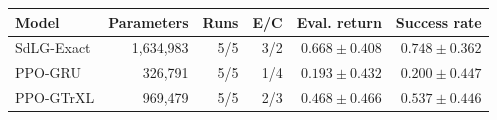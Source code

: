 \begin{tabular}{lrrrrr}
\toprule
Model & Parameters & Runs & E/C & Eval. return & Success rate \\
\midrule
SdLG-Exact & 1,634,983 & 5/5 & 3/2 & $0.668\pm0.408$ & $0.748\pm0.362$ \\
PPO-GRU & 326,791 & 5/5 & 1/4 & $0.193\pm0.432$ & $0.200\pm0.447$ \\
PPO-GTrXL & 969,479 & 5/5 & 2/3 & $0.468\pm0.466$ & $0.537\pm0.446$ \\
\bottomrule
\end{tabular}
